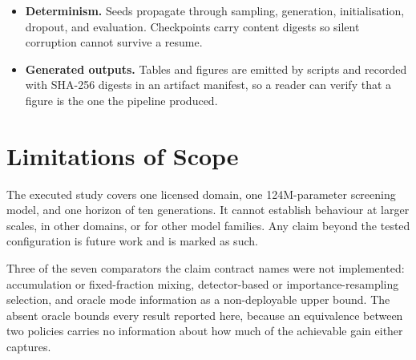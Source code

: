 \begin{itemize}
    micro-batch; resume neither double-counts nor drops the batch spanning a
    checkpoint. These properties are asserted by the accounting tests on fixtures.
    On the executed run they are \emph{not} recomputed from realised batch records,
    which were not retained: the declared ledger is checked against the frozen
    budget instead. Every chain carries this as a recorded limitation rather than
    as a silent assumption.
  \item \textbf{Determinism.} Seeds propagate through sampling, generation,
    initialisation, dropout, and evaluation. Checkpoints carry content digests so
    silent corruption cannot survive a resume.
  \item \textbf{Generated outputs.} Tables and figures are emitted by scripts and
    recorded with SHA-256 digests in an artifact manifest, so a reader can verify
    that a figure is the one the pipeline produced.
\end{itemize}

\section{Limitations of Scope}
\label{app:scope}

The executed study covers one licensed domain, one 124M-parameter screening model,
and one horizon of ten generations. It cannot establish behaviour at larger scales,
in other domains, or for other model families. Any claim beyond the tested
configuration is future work and is marked as such.

Three of the seven comparators the claim contract names were not implemented:
accumulation or fixed-fraction mixing, detector-based or importance-resampling
selection, and oracle mode information as a non-deployable upper bound. The absent
oracle bounds every result reported here, because an equivalence between two
policies carries no information about how much of the achievable gain either
captures.
